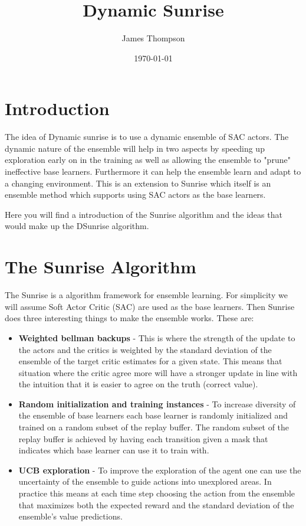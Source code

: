 \documentclass[12pt]{article}
\title{Dynamic Sunrise}
\author{James Thompson}
\date{\today}
\begin{document}
\maketitle

\section{Introduction}
The idea of Dynamic sunrise is to use a dynamic ensemble of SAC actors. The dynamic nature of the ensemble will help in two aspects by speeding up exploration early on in the training as well as allowing the ensemble to "prune" ineffective base learners. Furthermore it can help the ensemble learn and adapt to a changing environment. This is an extension to Sunrise which itself is an ensemble method which supports using SAC actors as the base learners.

Here you will find a introduction of the Sunrise algorithm and the ideas that would make up the DSunrise algorithm.

\section{The Sunrise Algorithm}

The Sunrise is a algorithm framework for ensemble learning. For simplicity we will assume Soft Actor Critic (SAC) are used as the base learners. Then Sunrise does three interesting things to make the ensemble works. These are:
\begin{itemize}
    \item \textbf{Weighted bellman backups} - This is where the strength of the update to the actors and the critics is weighted by the standard deviation of the ensemble of the target critic estimates for a given state. This means that situation where the critic agree more will have a stronger update in line with the intuition that it is easier to agree on the truth (correct value).
    \item \textbf{Random initialization and training instances} - To increase diversity of the ensemble of base learners each base learner is randomly initialized and trained on a random subset of the replay buffer. The random subset of the replay buffer is achieved by having each transition given a mask that indicates which base learner can use it to train with.
    \item \textbf{UCB exploration} - To improve the exploration of the agent one can use the uncertainty of the ensemble to guide actions into unexplored areas. In practice this means at each time step choosing the action from the ensemble that maximizes both the expected reward and the standard deviation of the ensemble's value predictions.
\end{itemize}
\end{document}

